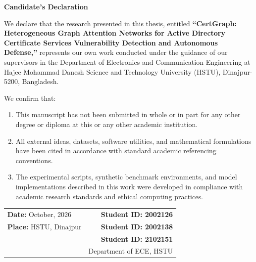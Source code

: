 \thispagestyle{empty}
\begin{center}
    {\fontsize{18pt}{22pt}\selectfont \textbf{Candidate's Declaration} \par}
\end{center}

\vspace{0.8cm}
\noindent We declare that the research presented in this thesis, entitled \textbf{``CertGraph: Heterogeneous Graph Attention Networks for Active Directory Certificate Services Vulnerability Detection and Autonomous Defense,''} represents our own work conducted under the guidance of our supervisors in the Department of Electronics and Communication Engineering at Hajee Mohammad Danesh Science and Technology University (HSTU), Dinajpur-5200, Bangladesh.

\vspace{0.5cm}
\noindent We confirm that:
\begin{enumerate}
    \item This manuscript has not been submitted in whole or in part for any other degree or diploma at this or any other academic institution.
    \item All external ideas, datasets, software utilities, and mathematical formulations have been cited in accordance with standard academic referencing conventions.
    \item The experimental scripts, synthetic benchmark environments, and model implementations described in this work were developed in compliance with academic research standards and ethical computing practices.
\end{enumerate}

\vfill
\noindent
\begin{tabular*}{\textwidth}{@{\extracolsep{\fill}}lr}
    \textbf{Date:} October, 2026 & \textbf{Student ID: 2002126} \\[0.3cm]
    \textbf{Place:} HSTU, Dinajpur & \textbf{Student ID: 2002138} \\[0.3cm]
    & \textbf{Student ID: 2102151} \\[0.4cm]
    & Department of ECE, HSTU
\end{tabular*}
